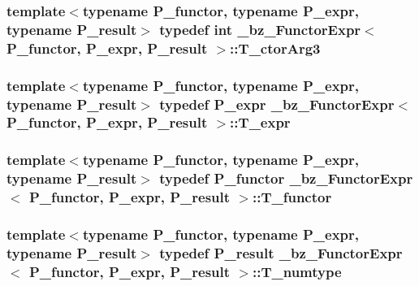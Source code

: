 \subsubsection[{T\+\_\+ctor\+Arg3}]{\setlength{\rightskip}{0pt plus 5cm}template$<$typename P\+\_\+functor, typename P\+\_\+expr, typename P\+\_\+result$>$ typedef int {\bf \+\_\+bz\+\_\+\+Functor\+Expr}$<$ P\+\_\+functor, P\+\_\+expr, P\+\_\+result $>$\+::{\bf T\+\_\+ctor\+Arg3}}\label{class__bz__FunctorExpr_acdea39191b95dc668cc2658c38d6e1a7}
\hypertarget{class__bz__FunctorExpr_ae52bb9b2640fb1ad5efde18b4369fdea}{}
\subsubsection[{T\+\_\+expr}]{\setlength{\rightskip}{0pt plus 5cm}template$<$typename P\+\_\+functor, typename P\+\_\+expr, typename P\+\_\+result$>$ typedef P\+\_\+expr {\bf \+\_\+bz\+\_\+\+Functor\+Expr}$<$ P\+\_\+functor, P\+\_\+expr, P\+\_\+result $>$\+::{\bf T\+\_\+expr}}\label{class__bz__FunctorExpr_ae52bb9b2640fb1ad5efde18b4369fdea}
\hypertarget{class__bz__FunctorExpr_a6c0ecd2aeb9dea27ad1a9b9cbc6dd869}{}
\subsubsection[{T\+\_\+functor}]{\setlength{\rightskip}{0pt plus 5cm}template$<$typename P\+\_\+functor, typename P\+\_\+expr, typename P\+\_\+result$>$ typedef P\+\_\+functor {\bf \+\_\+bz\+\_\+\+Functor\+Expr}$<$ P\+\_\+functor, P\+\_\+expr, P\+\_\+result $>$\+::{\bf T\+\_\+functor}}\label{class__bz__FunctorExpr_a6c0ecd2aeb9dea27ad1a9b9cbc6dd869}
\hypertarget{class__bz__FunctorExpr_a4adadf2cfc27ce07971936d0b3d5ca65}{}
\subsubsection[{T\+\_\+numtype}]{\setlength{\rightskip}{0pt plus 5cm}template$<$typename P\+\_\+functor, typename P\+\_\+expr, typename P\+\_\+result$>$ typedef P\+\_\+result {\bf \+\_\+bz\+\_\+\+Functor\+Expr}$<$ P\+\_\+functor, P\+\_\+expr, P\+\_\+result $>$\+::{\bf T\+\_\+numtype}}\label{class__bz__FunctorExpr_a4adadf2cfc27ce07971936d0b3d5ca65}
\hypertarget{class__bz__FunctorExpr_adb2f73864a148ca1e9f7022f4ecb3144}{}
